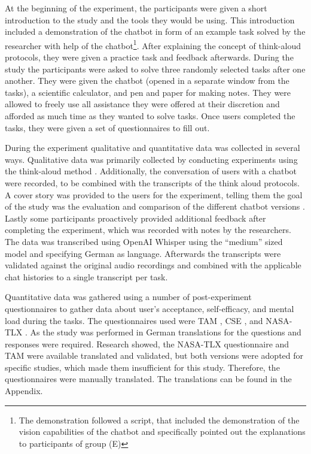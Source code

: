 At the beginning of the experiment, the participants were given a short introduction to the study and the tools they would be using. This introduction included a demonstration of the chatbot in form of an example task solved by the researcher with help of the chatbot\footnote{The demonstration followed a script, that included the demonstration of the vision capabilities of the chatbot and specifically pointed out the explanations to participants of group (E)}. After explaining the concept of think-aloud protocols, they were given a practice task and feedback afterwards. During the study the participants were asked to solve three randomly selected tasks after one another. They were given the chatbot (opened in a separate window from the tasks), a scientific calculator, and pen and paper for making notes. They were allowed to freely use all assistance they were offered at their discretion and afforded as much time as they wanted to solve tasks. Once users completed the tasks, they were given a set of questionnaires to fill out.

During the experiment qualitative and quantitative data was collected in several ways. Qualitative data was primarily collected by conducting experiments using the think-aloud method \parencite{VanSomeren1994}. Additionally, the conversation of users with a chatbot were recorded, to be combined with the transcripts of the think aloud protocols. A cover story was provided to the users for the experiment, telling them the goal of the study was the evaluation and comparison of the different chatbot versions \parencite{VanSomeren1994, Jussupow2021}. Lastly some participants proactively provided additional feedback after completing the experiment, which was recorded with notes by the researchers. The data was transcribed using OpenAI Whisper \parencite{Radford2022} using the “medium” sized model and specifying German as language. Afterwards the transcripts were validated against the original audio recordings and combined with the applicable chat histories to a single transcript per task.

Quantitative data was gathered using a number of post-experiment questionnaires to gather data about user's acceptance, self-efficacy, and mental load during the tasks. The questionnaires used were \ac{TAM} \parencite{Davis1989}, \ac{CSE} \parencite{Compeau1995}, and \acs{NASA}-\ac{TLX} \parencite{Hart1988}. As the study was performed in German translations for the questions and responses were required. Research showed, the \acs{NASA}-\ac{TLX} questionnaire \parencite{Flaegel2019} and \ac{TAM} \parencite{Jockisch2010} were available translated and validated, but both versions were adopted for specific studies, which made them insufficient for this study. Therefore, the questionnaires were manually translated. The translations can be found in the Appendix.

